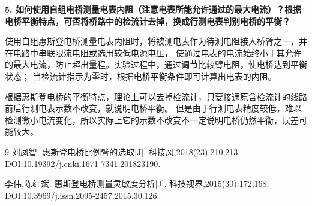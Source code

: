 \documentclass{Phyport}
\begin{document}
\textbf{5. 如何使用自组电桥测量电表内阻（注意电表所能允许通过的最大电流）？根据电桥平衡特点，可否将桥路中的检流计去掉，换成行测电表判别电桥的平衡？}

使用自组惠斯登电桥测量电表内阻时，将被测电表作为待测电阻接入桥臂之一，并在电路中串联限流电阻或选用较低电源电压，
使通过电表的电流始终小于其允许的最大电流，防止超出量程。实验过程中，通过调节比较臂电阻，使电桥达到平衡状态；
当检流计指示为零时，根据电桥平衡条件即可计算出电表的内阻。

根据惠斯登电桥的平衡特点，理论上可以去掉检流计，只要接通原含检流计的线路前后行测电表示数不改变，就说明电桥平衡。
但是由于行测电表精度较低，难以检测微小电流变化，所以实际上它的示数不改变不一定说明电桥仍然平衡，误差可能较大。

\begin{thebibliography}{9}
    刘凤智. 惠斯登电桥比例臂的选取[J]. 科技风,2018(23):210,213. DOI:10.19392/j.cnki.1671-7341.201823190. 
    
    李伟,陈红斌. 惠斯登电桥测量灵敏度分析[J]. 科技视界,2015(30):172,168. DOI:10.3969/j.issn.2095-2457.2015.30.126. 

\end{thebibliography}


\end{document}
